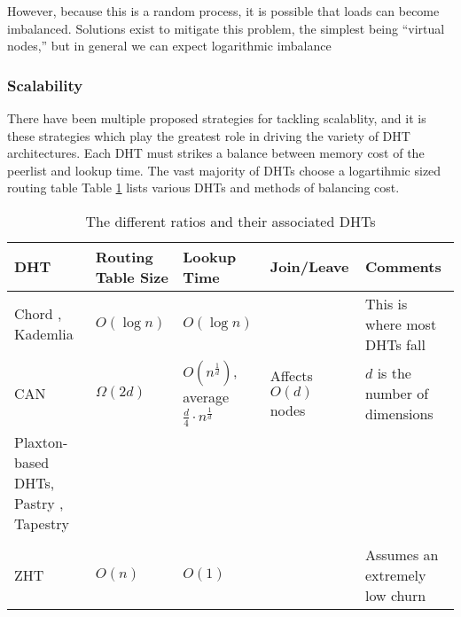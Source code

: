 \documentclass[10pt,letterpaper]{report}
\begin{document}
However, because this is a random process, it is possible that loads can become imbalanced.
Solutions exist \cite{godfrey2005heterogeneity} to mitigate this problem, the simplest being ``virtual nodes,'' but in general we can expect logarithmic imbalance%



\subsubsection{Scalability}
There have been multiple proposed strategies for tackling scalablity, and it is these strategies which play the greatest role in driving the variety of DHT architectures. 
Each DHT must strikes a balance between memory cost of the peerlist and lookup time. 
The vast majority of DHTs choose a logartihmic sized routing table
Table \ref{tab:tradeoffs} lists various DHTs and methods of balancing cost.


\begin{table}[h]
	\small
    \centering
    \begin{tabularx}{\textwidth}{ |X|X|X|X|X| }
    \hline
    DHT & Routing Table Size & Lookup Time & Join/Leave & Comments \\ \hline  
    Chord \cite{chord}, Kademlia \cite{kademlia} & $O(\log n)$ & $O(\log n)$ & & This is where most DHTs fall  \\ \hline
    CAN \cite{can} & $\Omega(2d)$ & $O(n^{\frac{1}{d}})$, average $\frac{d}{4}\cdot n^{\frac{1}{d}}$ & Affects $O(d)$ nodes & $d$ is the number of dimensions \\ \hline
    
    Plaxton-based DHTs, Pastry \cite{pastry}, Tapestry \cite{tapestry} &  & & & \\ \hline
    & & & & \\ \hline  
    ZHT \cite{li2013zht}&   $O(n)$& $O(1)$ &  &Assumes an extremely low churn \\ \hline
    \end{tabularx}
    \caption{The different ratios and their associated DHTs}
    \label{tab:tradeoffs}
\end{table}
\end{document}

